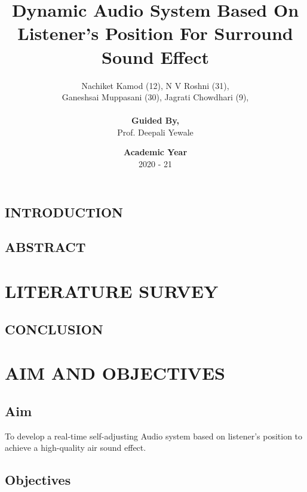 \documentclass[twocolumn]{report}
\title{\textbf{Dynamic Audio System Based On Listener's Position For Surround Sound Effect}}
\author{Nachiket Kamod (12), N V Roshni (31),\\Ganeshsai Muppasani (30), Jagrati Chowdhari (9), \\\\\textbf{Guided By,}\\Prof. Deepali Yewale}
\date{\textbf{Academic Year}\\2020 - 21}
\begin{document}
\maketitle

\tableofcontents

\listoffigures

\chapter{}

\section{INTRODUCTION}



\section{ABSTRACT}



\chapter{LITERATURE SURVEY}



\section{CONCLUSION}



\chapter{AIM AND OBJECTIVES}

\section{Aim}

To develop a real-time self-adjusting Audio system based on listener's 
position to achieve a high-quality air sound effect.

\section{Objectives}
\end{document}
